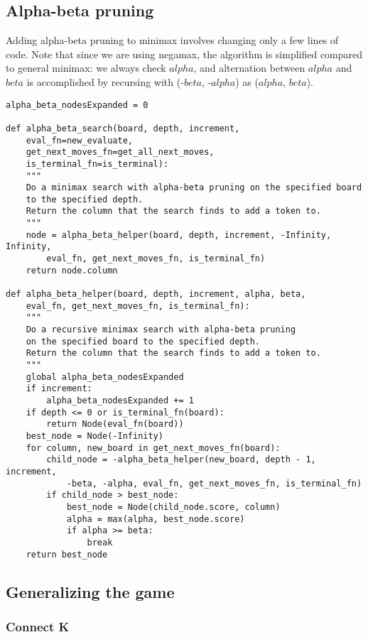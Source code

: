 \documentclass[11pt]{article}
\begin{document}
\subsection{Alpha-beta pruning}

Adding alpha-beta pruning to minimax involves changing only a few lines of code.
Note that since we are using negamax, the algorithm is simplified compared to
general minimax: we always check \(alpha\), and alternation between \(alpha\)
and \(beta\) is accomplished by recursing with (-\(beta\), -\(alpha\)) as
(\(alpha\), \(beta\)).

\lstset{language=Python}
\begin{lstlisting}[frame=single]
alpha_beta_nodesExpanded = 0

def alpha_beta_search(board, depth, increment,
	eval_fn=new_evaluate,
	get_next_moves_fn=get_all_next_moves,
	is_terminal_fn=is_terminal):
	"""
	Do a minimax search with alpha-beta pruning on the specified board
	to the specified depth.
	Return the column that the search finds to add a token to.
	"""
	node = alpha_beta_helper(board, depth, increment, -Infinity, Infinity,
		eval_fn, get_next_moves_fn, is_terminal_fn)
	return node.column

def alpha_beta_helper(board, depth, increment, alpha, beta,
	eval_fn, get_next_moves_fn, is_terminal_fn):
	"""
	Do a recursive minimax search with alpha-beta pruning
	on the specified board to the specified depth.
	Return the column that the search finds to add a token to.
	"""
	global alpha_beta_nodesExpanded
	if increment:
		alpha_beta_nodesExpanded += 1
	if depth <= 0 or is_terminal_fn(board):
		return Node(eval_fn(board))
	best_node = Node(-Infinity)
	for column, new_board in get_next_moves_fn(board):
		child_node = -alpha_beta_helper(new_board, depth - 1, increment,
			-beta, -alpha, eval_fn, get_next_moves_fn, is_terminal_fn)
		if child_node > best_node:
			best_node = Node(child_node.score, column)
			alpha = max(alpha, best_node.score)
			if alpha >= beta:
				break
	return best_node
\end{lstlisting}

\subsection{Generalizing the game}

\subsubsection{Connect K}
\end{document}
